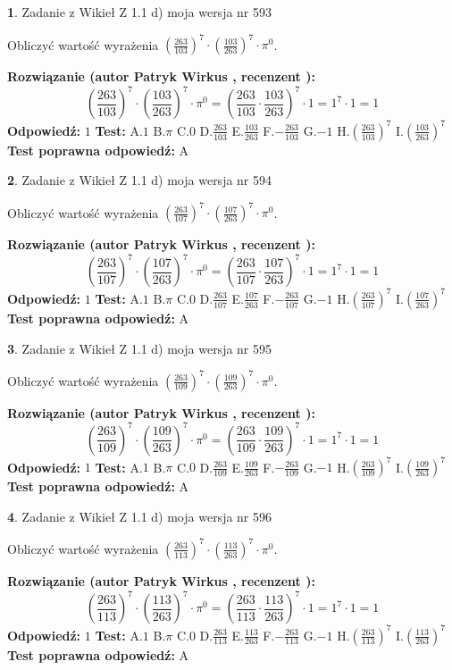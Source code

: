 \documentclass[12pt, a4paper]{article}
\theoremstyle{definition} %
\newtheorem{zad}{}
\newcommand{\zadStart}[1]{\begin{zad}#1\newline}
\newcommand{\zadStop}{\end{zad}}
\newcommand{\rozwStart}[2]{\noindent \textbf{Rozwiązanie (autor #1 , recenzent #2): }\newline}
\newcommand{\rozwStop}{\newline}
\newcommand{\odpStart}{\noindent \textbf{Odpowiedź:}\newline}
\newcommand{\odpStop}{\newline}
\newcommand{\testStart}{\noindent \textbf{Test:}\newline}
\newcommand{\testStop}{\newline}
\newcommand{\kluczStart}{\noindent \textbf{Test poprawna odpowiedź:}\newline}
\newcommand{\kluczStop}{\newline}
\begin{document}
\zadStart{Zadanie z Wikieł Z 1.1 d) moja wersja nr 593}

Obliczyć wartość wyrażenia $(\frac{263}{103})^{7} \cdot (\frac{103}{263})^{7} \cdot \pi^{0}$.
\zadStop
\rozwStart{Patryk Wirkus}{}
$$(\frac{263}{103})^{7} \cdot (\frac{103}{263})^{7} \cdot \pi^{0} = (\frac{263}{103} \cdot \frac{103}{263})^{7} \cdot 1 = 1^{7} \cdot 1 = 1$$
\rozwStop
\odpStart
$1$
\odpStop
\testStart
A.$1$ B.$\pi$ C.$0$ D.$\frac{263}{103}$ E.$\frac{103}{263}$
F.$-\frac{263}{103}$ G.$-1$
H.$(\frac{263}{103})^{7}$
I.$(\frac{103}{263})^{7}$
\testStop
\kluczStart
A
\kluczStop



\zadStart{Zadanie z Wikieł Z 1.1 d) moja wersja nr 594}

Obliczyć wartość wyrażenia $(\frac{263}{107})^{7} \cdot (\frac{107}{263})^{7} \cdot \pi^{0}$.
\zadStop
\rozwStart{Patryk Wirkus}{}
$$(\frac{263}{107})^{7} \cdot (\frac{107}{263})^{7} \cdot \pi^{0} = (\frac{263}{107} \cdot \frac{107}{263})^{7} \cdot 1 = 1^{7} \cdot 1 = 1$$
\rozwStop
\odpStart
$1$
\odpStop
\testStart
A.$1$ B.$\pi$ C.$0$ D.$\frac{263}{107}$ E.$\frac{107}{263}$
F.$-\frac{263}{107}$ G.$-1$
H.$(\frac{263}{107})^{7}$
I.$(\frac{107}{263})^{7}$
\testStop
\kluczStart
A
\kluczStop



\zadStart{Zadanie z Wikieł Z 1.1 d) moja wersja nr 595}

Obliczyć wartość wyrażenia $(\frac{263}{109})^{7} \cdot (\frac{109}{263})^{7} \cdot \pi^{0}$.
\zadStop
\rozwStart{Patryk Wirkus}{}
$$(\frac{263}{109})^{7} \cdot (\frac{109}{263})^{7} \cdot \pi^{0} = (\frac{263}{109} \cdot \frac{109}{263})^{7} \cdot 1 = 1^{7} \cdot 1 = 1$$
\rozwStop
\odpStart
$1$
\odpStop
\testStart
A.$1$ B.$\pi$ C.$0$ D.$\frac{263}{109}$ E.$\frac{109}{263}$
F.$-\frac{263}{109}$ G.$-1$
H.$(\frac{263}{109})^{7}$
I.$(\frac{109}{263})^{7}$
\testStop
\kluczStart
A
\kluczStop



\zadStart{Zadanie z Wikieł Z 1.1 d) moja wersja nr 596}

Obliczyć wartość wyrażenia $(\frac{263}{113})^{7} \cdot (\frac{113}{263})^{7} \cdot \pi^{0}$.
\zadStop
\rozwStart{Patryk Wirkus}{}
$$(\frac{263}{113})^{7} \cdot (\frac{113}{263})^{7} \cdot \pi^{0} = (\frac{263}{113} \cdot \frac{113}{263})^{7} \cdot 1 = 1^{7} \cdot 1 = 1$$
\rozwStop
\odpStart
$1$
\odpStop
\testStart
A.$1$ B.$\pi$ C.$0$ D.$\frac{263}{113}$ E.$\frac{113}{263}$
F.$-\frac{263}{113}$ G.$-1$
H.$(\frac{263}{113})^{7}$
I.$(\frac{113}{263})^{7}$
\testStop
\kluczStart
A
\kluczStop
\end{document}
